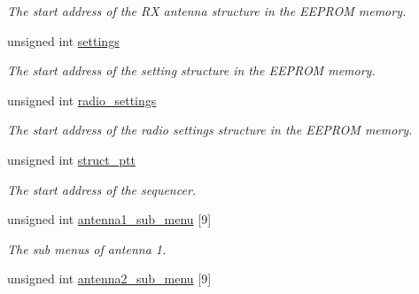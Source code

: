 \begin{CompactItemize}
\begin{CompactList}\small\item\em The start address of the RX antenna structure in the EEPROM memory. \item\end{CompactList}\item 
\hypertarget{structstruct__eeprom__table_d4d17049af5cf3281f92993784dd8e75}{
unsigned int \hyperlink{structstruct__eeprom__table_d4d17049af5cf3281f92993784dd8e75}{settings}}
\label{structstruct__eeprom__table_d4d17049af5cf3281f92993784dd8e75}

\begin{CompactList}\small\item\em The start address of the setting structure in the EEPROM memory. \item\end{CompactList}\item 
\hypertarget{structstruct__eeprom__table_50e038c99a033980ff476c2f4bde86cd}{
unsigned int \hyperlink{structstruct__eeprom__table_50e038c99a033980ff476c2f4bde86cd}{radio\_\-settings}}
\label{structstruct__eeprom__table_50e038c99a033980ff476c2f4bde86cd}

\begin{CompactList}\small\item\em The start address of the radio settings structure in the EEPROM memory. \item\end{CompactList}\item 
\hypertarget{structstruct__eeprom__table_6830b27e207021e867f63bc91ccee980}{
unsigned int \hyperlink{structstruct__eeprom__table_6830b27e207021e867f63bc91ccee980}{struct\_\-ptt}}
\label{structstruct__eeprom__table_6830b27e207021e867f63bc91ccee980}

\begin{CompactList}\small\item\em The start address of the sequencer. \item\end{CompactList}\item 
\hypertarget{structstruct__eeprom__table_d64f6da74d774283ba4bc45d11b2afe7}{
unsigned int \hyperlink{structstruct__eeprom__table_d64f6da74d774283ba4bc45d11b2afe7}{antenna1\_\-sub\_\-menu} \mbox{[}9\mbox{]}}
\label{structstruct__eeprom__table_d64f6da74d774283ba4bc45d11b2afe7}

\begin{CompactList}\small\item\em The sub menus of antenna 1. \item\end{CompactList}\item 
\hypertarget{structstruct__eeprom__table_c03bc10420fc7ae1362d9cf3b4c8b0f2}{
unsigned int \hyperlink{structstruct__eeprom__table_c03bc10420fc7ae1362d9cf3b4c8b0f2}{antenna2\_\-sub\_\-menu} \mbox{[}9\mbox{]}}
\label{structstruct__eeprom__table_c03bc10420fc7ae1362d9cf3b4c8b0f2}


\end{CompactItemize}
